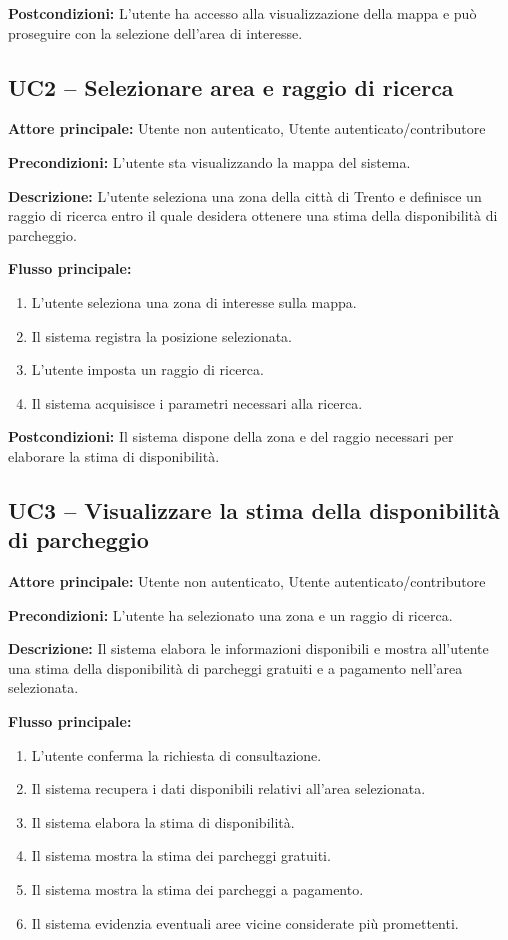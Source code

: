 \documentclass[a4paper,12pt]{article}
\begin{document}
\textbf{Postcondizioni:} L'utente ha accesso alla visualizzazione della mappa e può proseguire con la selezione dell'area di interesse.
\subsection*{UC2 -- Selezionare area e raggio di ricerca}

\textbf{Attore principale:} Utente non autenticato, Utente autenticato/contributore

\textbf{Precondizioni:} L'utente sta visualizzando la mappa del sistema.

\textbf{Descrizione:}  
L'utente seleziona una zona della città di Trento e definisce un raggio di ricerca entro il quale desidera ottenere una stima della disponibilità di parcheggio.

\textbf{Flusso principale:}
\begin{enumerate}
    \item L'utente seleziona una zona di interesse sulla mappa.
    \item Il sistema registra la posizione selezionata.
    \item L'utente imposta un raggio di ricerca.
    \item Il sistema acquisisce i parametri necessari alla ricerca.
\end{enumerate}

\textbf{Postcondizioni:} Il sistema dispone della zona e del raggio necessari per elaborare la stima di disponibilità.
\subsection*{UC3 -- Visualizzare la stima della disponibilità di parcheggio}

\textbf{Attore principale:} Utente non autenticato, Utente autenticato/contributore

\textbf{Precondizioni:} L'utente ha selezionato una zona e un raggio di ricerca.

\textbf{Descrizione:}  
Il sistema elabora le informazioni disponibili e mostra all'utente una stima della disponibilità di parcheggi gratuiti e a pagamento nell'area selezionata.

\textbf{Flusso principale:}
\begin{enumerate}
    \item L'utente conferma la richiesta di consultazione.
    \item Il sistema recupera i dati disponibili relativi all'area selezionata.
    \item Il sistema elabora la stima di disponibilità.
    \item Il sistema mostra la stima dei parcheggi gratuiti.
    \item Il sistema mostra la stima dei parcheggi a pagamento.
    \item Il sistema evidenzia eventuali aree vicine considerate più promettenti.
\end{enumerate}
\end{document}
